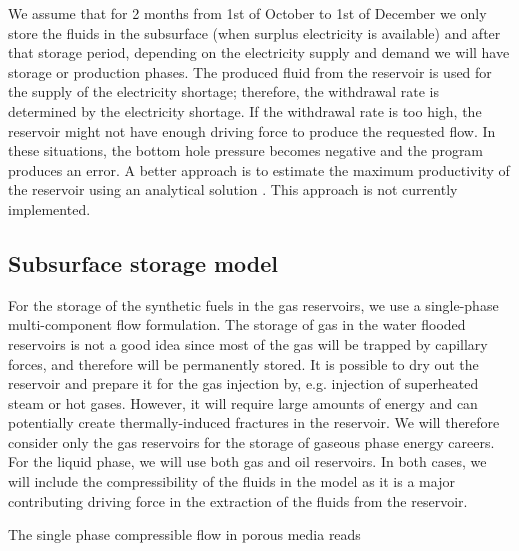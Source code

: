 \documentclass{ECOS_2021}
\begin{document}
We assume that for 2 months from 1st of October to 1st of December
we only store the fluids in the subsurface (when surplus electricity
is available) and after that storage period, depending on the electricity
supply and demand we will have storage or production phases. The produced
fluid from the reservoir is used for the supply of the electricity
shortage; therefore, the withdrawal rate is determined by the electricity
shortage. If the withdrawal rate is too high, the reservoir might
not have enough driving force to produce the requested flow. In these
situations, the bottom hole pressure becomes negative and the program
produces an error. A better approach is to estimate the maximum productivity
of the reservoir using an analytical solution \cite{hagoortFundamentalsGasReservoir1988,al-hussainyApplicationRealGas1966,al-hussainyFlowRealGases1966}.
This approach is not currently implemented. 


\sffamily \subsection{Subsurface storage model}
\normalsize
For the storage of the synthetic fuels in the gas
reservoirs, we use a single-phase multi-component flow formulation.
The storage of gas in the water flooded reservoirs is not a good idea
since most of the gas will be trapped by capillary forces, and therefore
will be permanently stored. It is possible to dry out the reservoir
and prepare it for the gas injection by, e.g. injection of superheated
steam or hot gases. However, it will require large amounts of energy
and can potentially create thermally-induced fractures in the reservoir.
We will therefore consider only the gas reservoirs for the storage
of gaseous phase energy careers. For the liquid phase, we will use
both gas and oil reservoirs. In both cases, we will include the compressibility
of the fluids in the model as it is a major contributing driving force
in the extraction of the fluids from the reservoir.

The single phase compressible flow in porous media reads
\end{document}
